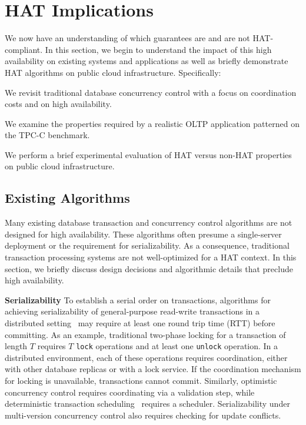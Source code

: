 
\section{HAT Implications}
\label{sec:evaluation}

We now have an understanding of which guarantees are and are not
HAT-compliant. In this section, we begin to understand the impact of
this high availability on existing systems and applications as well as
briefly demonstrate HAT algorithms on public cloud
infrastructure. Specifically:

\begin{myenumerate}
\item We revisit traditional database concurrency control with a focus
  on coordination costs and on high availability.
\item We examine the properties required by a realistic OLTP
  application patterned on the TPC-C benchmark.
\item We perform a brief experimental evaluation of HAT versus non-HAT
  properties on public cloud infrastructure.
\end{myenumerate}

\subsection{Existing Algorithms}

Many existing database transaction and concurrency control algorithms
are not designed for high availability. These algorithms often presume
a single-server deployment or the requirement for serializability. As
a consequence, traditional transaction processing systems are not
well-optimized for a HAT context. In this section, we briefly discuss
design decisions and algorithmic details that preclude high
availability.

\vspace{.5em}\noindent\textbf{Serializability} To establish a serial
order on transactions, algorithms for achieving serializability of
general-purpose read-write transactions in a distributed
setting~\cite{bernstein-book} may require at least one round trip time
(RTT) before committing. As an example, traditional two-phase locking
for a transaction of length $T$ requires $T$ \texttt{lock} operations
and at least one \texttt{unlock} operation.  In a distributed
environment, each of these operations requires coordination, either
with other database replicas or with a lock service. If the
coordination mechanism for locking is unavailable, transactions cannot
commit. Similarly, optimistic concurrency control requires
coordinating via a validation step, while deterministic transaction
scheduling~\cite{deterministic-scheduling} requires a
scheduler. Serializability under multi-version concurrency control
also requires checking for update conflicts.

